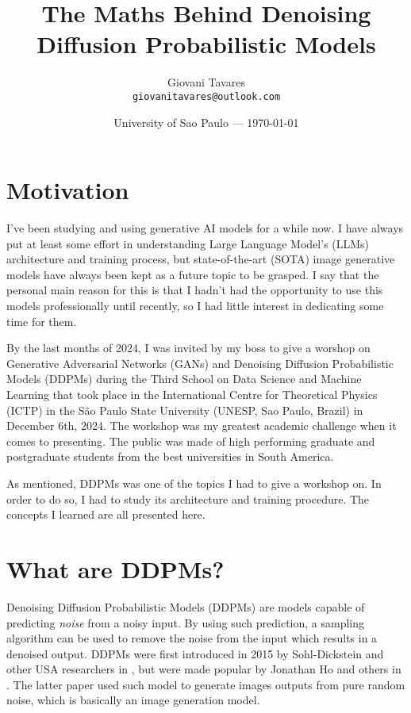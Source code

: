 \documentclass{article}
\title{The Maths Behind Denoising Diffusion Probabilistic Models} %
\author{Giovani Tavares\\ \texttt{giovanitavares@outlook.com}} %
\date{University of Sao Paulo --- \today} %
\begin{document}
\maketitle %


\section*{Motivation} %

I've been studying and using generative AI models for a while now. I have always put at least some effort in understanding Large Language Model's (LLMs) architecture and training process, but state-of-the-art (SOTA) image generative models have always been kept as a future topic to be grasped. I say that the personal main reason for this is that I hadn't had the opportunity to use this models professionally until recently, so I had little interest in dedicating some time for them.

By the last months of 2024, I was invited by my boss to give a worshop on Generative Adversarial Networks (GANs) and Denoising Diffusion Probabilistic Models (DDPMs) during the Third School on Data Science and Machine Learning that took place in the International Centre for Theoretical Physics (ICTP) in the São Paulo State University (UNESP, Sao Paulo, Brazil) in December 6th, 2024. The workshop was my greatest academic challenge when it comes to presenting. The public was made of high performing graduate and postgraduate students from the best universities in South America. 

As mentioned, DDPMs was one of the topics I had to give a workshop on. In order to do so, I had to study its architecture and training procedure. The concepts I learned are all presented here.


\section{What are DDPMs?} %

Denoising Diffusion Probabilistic Models (DDPMs) are  models capable of predicting \textit{noise} from a noisy input. By using such prediction, a sampling algorithm can be used to remove the noise from the input which results in a denoised output. DDPMs were first introduced in 2015 by Sohl-Dickstein and other USA researchers in \cite{DBLP:journals/corr/Sohl-DicksteinW15}, but were made popular by Jonathan Ho and others in \cite{DBLP:journals/corr/abs-2006-11239}. The latter paper used such model to generate images outputs from pure random noise, which is basically an image generation model.
\end{document}
